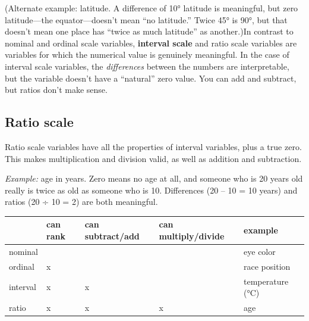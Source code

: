 \documentclass[
  letterpaper,
  DIV=11,
  numbers=noendperiod]{scrreprt}
\begin{document}
(Alternate example: latitude. A difference of 10° latitude is
meaningful, but zero latitude---the equator---doesn't mean ``no
latitude.'' Twice 45° is 90°, but that doesn't mean one place has
``twice as much latitude'' as another.)In contrast to nominal and
ordinal scale variables, \textbf{interval scale} and ratio scale
variables are variables for which the numerical value is genuinely
meaningful. In the case of interval scale variables, the
\emph{differences} between the numbers are interpretable, but the
variable doesn't have a ``natural'' zero value. You can add and
subtract, but ratios don't make sense.

\subsection{Ratio scale}\label{ratio-scale}

Ratio scale variables have all the properties of interval variables,
plus a true zero. This makes multiplication and division valid, as well
as addition and subtraction.

\emph{Example:} age in years. Zero means no age at all, and someone who
is 20 years old really is twice as old as someone who is 10. Differences
(20 -- 10 = 10 years) and ratios (20 ÷ 10 = 2) are both meaningful.

\begin{longtable}[]{@{}
  >{\raggedright\arraybackslash}p{}
  >{\centering\arraybackslash}p{}
  >{\centering\arraybackslash}p{}
  >{\centering\arraybackslash}p{}
  >{\raggedright\arraybackslash}p{}@{}}
\toprule\noalign{}
\begin{minipage}[b]{\linewidth}\raggedright
\end{minipage} & \begin{minipage}[b]{\linewidth}\centering
can rank
\end{minipage} & \begin{minipage}[b]{\linewidth}\centering
can subtract/add
\end{minipage} & \begin{minipage}[b]{\linewidth}\centering
can multiply/divide
\end{minipage} & \begin{minipage}[b]{\linewidth}\raggedright
example
\end{minipage} \\
\midrule\noalign{}
\endhead
\bottomrule\noalign{}
\endlastfoot
nominal & & & & eye color \\
ordinal & x & & & race position \\
interval & x & x & & temperature (°C) \\
ratio & x & x & x & age \\
\end{longtable}
\end{document}
